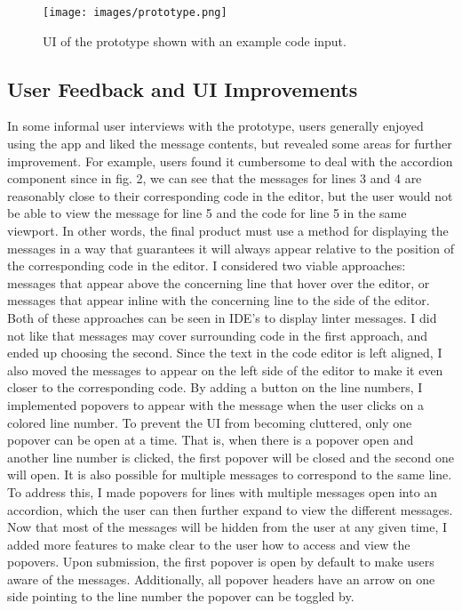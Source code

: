 \documentclass[10pt,twocolumn]{article}
\begin{document}
\begin{figure}
\texttt{[image: images/prototype.png]}
\centering
\vspace{.5cm}
\caption{UI of the prototype shown with an example code input.}
\end{figure}

\subsection{User Feedback and UI Improvements}
In some informal user interviews with the prototype, users generally enjoyed using the app and liked the message contents, but revealed some areas for further improvement.
For example, users found it cumbersome to deal with the accordion component since in fig. 2, we can see that the messages for lines 3 and 4 are reasonably close to their corresponding code in the editor, but the user would not be able to view the message for line 5 and the code for line 5 in the same viewport. 
In other words, the final product must use a method for displaying the messages in a way that guarantees it will always appear relative to the position of the corresponding code in the editor. 
I considered two viable approaches: messages that appear above the concerning line that hover over the editor, or messages that appear inline with the concerning line to the side of the editor. 
Both of these approaches can be seen in IDE's to display linter messages. 
I did not like that messages may cover surrounding code in the first approach, and ended up choosing the second. 
Since the text in the code editor is left aligned, I also moved the messages to appear on the left side of the editor to make it even closer to the corresponding code. 
By adding a button on the line numbers, I implemented popovers to appear with the message when the user clicks on a colored line number. 
To prevent the UI from becoming cluttered, only one popover can be open at a time. 
That is, when there is a popover open and another line number is clicked, the first popover will be closed and the second one will open. 
It is also possible for multiple messages to correspond to the same line. 
To address this, I made popovers for lines with multiple messages open into an accordion, which the user can then further expand to view the different messages. 
Now that most of the messages will be hidden from the user at any given time, I added more features to make clear to the user how to access and view the popovers. 
Upon submission, the first popover is open by default to make users aware of the messages. 
Additionally, all popover headers have an arrow on one side pointing to the line number the popover can be toggled by. 
\end{document}
